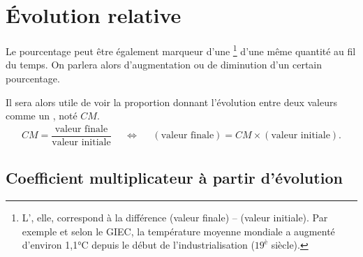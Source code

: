 \section{Évolution relative}

Le pourcentage peut être également marqueur d'une 
\footnote{L', elle, correspond à la différence (valeur finale) -- (valeur initiale). Par exemple et selon le GIEC, la température moyenne mondiale a augmenté d'environ 1,1°C depuis le début de l'industrialisation ($19^{\text{è}}$ siècle).}
d'une même quantité au fil du temps.
On parlera alors d'augmentation ou de diminution d'un certain pourcentage.

Il sera alors utile de voir la proportion donnant l'évolution entre deux valeurs comme un , noté $CM$.
	\begin{align}\label{eq:evolution}
		CM = \dfrac{\text{valeur finale}}{\text{valeur initiale}} && \iff && (\text{valeur finale}) = CM \times (\text{valeur initiale}).
	\end{align}





\subsection{Coefficient multiplicateur à partir d'évolution}



